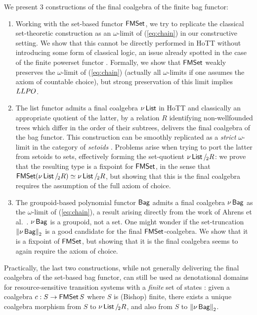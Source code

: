 \documentclass[runningheads]{llncs}
\begin{document}
We present 3 constructions of the final coalgebra of the finite bag functor:
\begin{enumerate}
\item Working with the set-based functor $\operatorname{\mathsf{FMSet}}$, we try to replicate the classical set-theoretic construction as an $\omega$-limit of (\ref{eq:chain}) in our constructive setting. We show that this cannot be directly performed in HoTT without introducing some form of classical logic, an issue already spotted in the case of the finite powerset functor \cite{Veltri2021}. Formally, we show that $\operatorname{\mathsf{FMSet}}$ weakly preserves the $\omega$-limit of (\ref{eq:chain}) (actually all $\omega$-limits if one assumes the axiom of countable choice), but strong preservation of this limit implies $LLPO$.
\item The list functor admits a final coalgebra $\nu\operatorname{\mathsf{List}}$ in HoTT \cite{Ahrens2015} and classically an appropriate quotient of the latter, by a relation $R$ identifying non-wellfounded trees which differ in the order of their subtrees, delivers the final coalgebra of the bag functor. This construction can be smoothly replicated as a \emph{strict} $\omega$-limit in the category of \emph{setoids} \cite{Barthe2003}. Problems arise when trying to port the latter from setoids to sets, effectively forming the set-quotient $\nu\operatorname{\mathsf{List}} \mathbin{/_{\!2}} R$: we prove that the resulting type is a fixpoint for $\operatorname{\mathsf{FMSet}}$, in the sense that $\operatorname{\mathsf{FMSet}} (\nu\operatorname{\mathsf{List}} \mathbin{/_{\!2}} R) \simeq \nu\operatorname{\mathsf{List}} \mathbin{/_{\!2}} R$, but showing that this is the final coalgebra requires the assumption of the full axiom of choice. 
\item The groupoid-based polynomial functor $\operatorname{\mathsf{Bag}}$ admits a final coalgebra $\nu\operatorname{\mathsf{Bag}}$ as the $\omega$-limit of (\ref{eq:chain}), a result arising directly from the work of Ahrens et al.~\cite{Ahrens2015}. $\nu\operatorname{\mathsf{Bag}}$ is a groupoid, not a set. One might wonder if the set-truncation ${\lVert \nu\operatorname{\mathsf{Bag}} \rVert}_{\mathsf{2}}$ is a good candidate for the final $\operatorname{\mathsf{FMSet}}$-coalgebra. We  show that it is a fixpoint of $\operatorname{\mathsf{FMSet}}$, but showing that it is the final coalgebra seems to again require the axiom of choice. 
\end{enumerate}
Practically, the last two constructions, while not generally delivering the final coalgebra of the set-based bag functor, can still be used as denotational domains for resource-sensitive transition systems with a \emph{finite} set of states \cite{Frumin2018}: given a coalgebra $c : S \to \operatorname{\mathsf{FMSet}} S$ where $S$ is (Bishop) finite, there exists a unique coalgebra morphism from $S$ to $\nu\operatorname{\mathsf{List}} \mathbin{/_{\!2}} R$, and also from $S$ to ${\lVert \nu\operatorname{\mathsf{Bag}} \rVert}_{\mathsf{2}}$.
\end{document}
